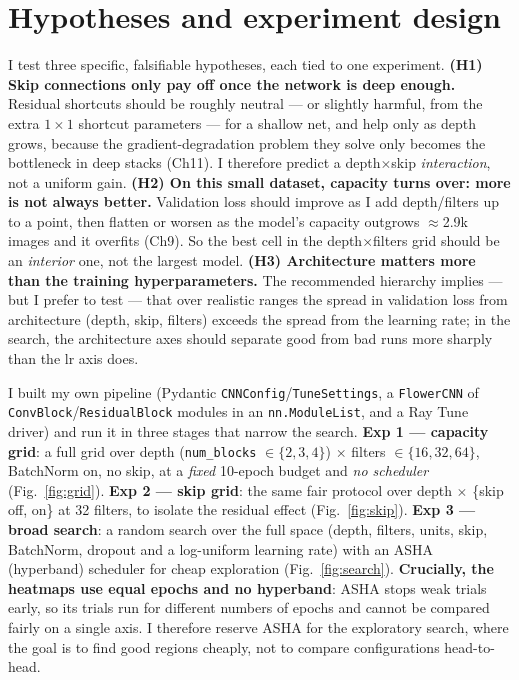 \documentclass[11pt,a4paper]{article}
\begin{document}
\section{Hypotheses and experiment design}
I test three specific, falsifiable hypotheses, each tied to one experiment.
\textbf{(H1) Skip connections only pay off once the network is deep enough.} Residual
shortcuts should be roughly neutral --- or slightly harmful, from the extra $1\times1$
shortcut parameters --- for a shallow net, and help only as depth grows, because the
gradient-degradation problem they solve only becomes the bottleneck in deep stacks
(Ch11). I therefore predict a depth$\times$skip \emph{interaction}, not a uniform
gain. \textbf{(H2) On this small dataset, capacity turns over: more is not always
better.} Validation loss should improve as I add depth/filters up to a point, then
flatten or worsen as the model's capacity outgrows $\approx$2.9k images and it
overfits (Ch9). So the best cell in the depth$\times$filters grid should be an
\emph{interior} one, not the largest model. \textbf{(H3) Architecture matters more
than the training hyperparameters.} The recommended hierarchy implies --- but I prefer
to test --- that over realistic ranges the spread in validation loss from
architecture (depth, skip, filters) exceeds the spread from the learning rate; in the
search, the architecture axes should separate good from bad runs more sharply than the
lr axis does.

I built my own pipeline (Pydantic \texttt{CNNConfig}/\texttt{TuneSettings}, a
\texttt{FlowerCNN} of \texttt{ConvBlock}/\texttt{ResidualBlock} modules in an
\texttt{nn.ModuleList}, and a Ray Tune driver) and run it in three stages that narrow
the search. \textbf{Exp 1 --- capacity grid}: a full grid over depth
(\texttt{num\_blocks} $\in\{2,3,4\}$) $\times$ filters $\in\{16,32,64\}$, BatchNorm
on, no skip, at a \emph{fixed} 10-epoch budget and \emph{no scheduler}
(Fig.~\ref{fig:grid}). \textbf{Exp 2 --- skip grid}: the same fair protocol over
depth $\times$ \{skip off, on\} at 32 filters, to isolate the residual effect
(Fig.~\ref{fig:skip}). \textbf{Exp 3 --- broad search}: a random search over the full
space (depth, filters, units, skip, BatchNorm, dropout and a log-uniform learning
rate) with an ASHA (hyperband) scheduler for cheap exploration
(Fig.~\ref{fig:search}). \textbf{Crucially, the heatmaps use equal epochs and no
hyperband}: ASHA stops weak trials early, so its trials run for different numbers of
epochs and cannot be compared fairly on a single axis. I therefore reserve ASHA for
the exploratory search, where the goal is to find good regions cheaply, not to compare
configurations head-to-head.
\end{document}
